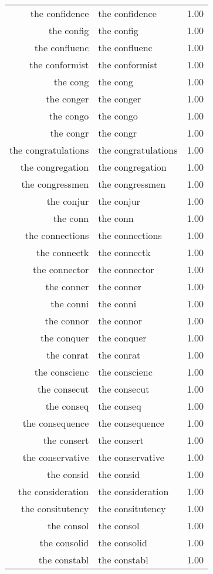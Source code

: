 \begin{table}[ht]
\begin{tabular}{rlr}
  the confidence & the confidence & 1.00 \\ 
  the config & the config & 1.00 \\ 
  the confluenc & the confluenc & 1.00 \\ 
  the conformist & the conformist & 1.00 \\ 
  the cong & the cong & 1.00 \\ 
  the conger & the conger & 1.00 \\ 
  the congo & the congo & 1.00 \\ 
  the congr & the congr & 1.00 \\ 
  the congratulations & the congratulations & 1.00 \\ 
  the congregation & the congregation & 1.00 \\ 
  the congressmen & the congressmen & 1.00 \\ 
  the conjur & the conjur & 1.00 \\ 
  the conn & the conn & 1.00 \\ 
  the connections & the connections & 1.00 \\ 
  the connectk & the connectk & 1.00 \\ 
  the connector & the connector & 1.00 \\ 
  the conner & the conner & 1.00 \\ 
  the conni & the conni & 1.00 \\ 
  the connor & the connor & 1.00 \\ 
  the conquer & the conquer & 1.00 \\ 
  the conrat & the conrat & 1.00 \\ 
  the conscienc & the conscienc & 1.00 \\ 
  the consecut & the consecut & 1.00 \\ 
  the conseq & the conseq & 1.00 \\ 
  the consequence & the consequence & 1.00 \\ 
  the consert & the consert & 1.00 \\ 
  the conservative & the conservative & 1.00 \\ 
  the consid & the consid & 1.00 \\ 
  the consideration & the consideration & 1.00 \\ 
  the consitutency & the consitutency & 1.00 \\ 
  the consol & the consol & 1.00 \\ 
  the consolid & the consolid & 1.00 \\ 
  the constabl & the constabl & 1.00 \\ 

\end{tabular}
\end{table}
